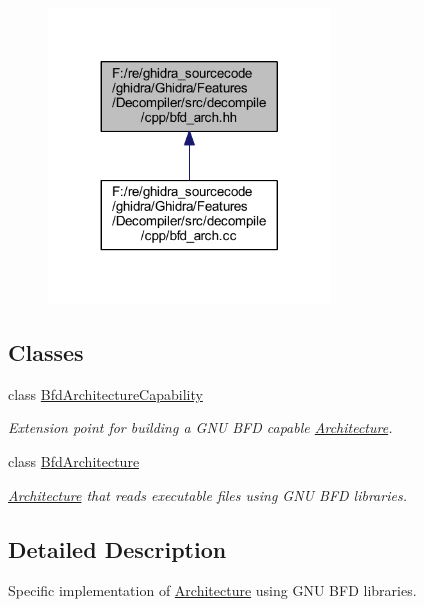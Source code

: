\begin{figure}[H]
\begin{center}
\leavevmode
\includegraphics[width=212pt]{bfd__arch_8hh__dep__incl}
\end{center}
\end{figure}
\subsection*{Classes}
\begin{DoxyCompactItemize}
\item 
class \mbox{\hyperlink{class_bfd_architecture_capability}{Bfd\+Architecture\+Capability}}
\begin{DoxyCompactList}\small\item\em Extension point for building a G\+NU B\+FD capable \mbox{\hyperlink{class_architecture}{Architecture}}. \end{DoxyCompactList}\item 
class \mbox{\hyperlink{class_bfd_architecture}{Bfd\+Architecture}}
\begin{DoxyCompactList}\small\item\em \mbox{\hyperlink{class_architecture}{Architecture}} that reads executable files using G\+NU B\+FD libraries. \end{DoxyCompactList}\end{DoxyCompactItemize}


\subsection{Detailed Description}
Specific implementation of \mbox{\hyperlink{class_architecture}{Architecture}} using G\+NU B\+FD libraries. 

